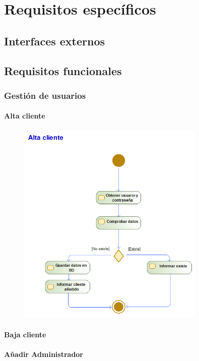 \section{Requisitos específicos}
\subsection{Interfaces externos}
\subsection{Requisitos funcionales}
\subsubsection{Gestión de usuarios}%
\paragraph{Alta cliente}
\begin{figure}[H]
    \centering
    \includegraphics[width=0.8\textwidth]{Use_Cases/alta_cliente.png}
\end{figure}
\paragraph{Baja cliente}
\paragraph{Añadir Administrador}
